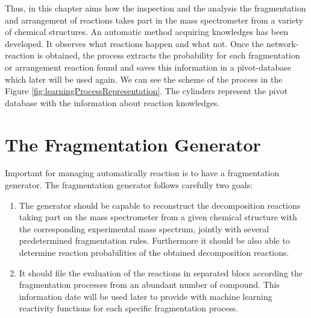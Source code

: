 \documentclass[10pt]{bmc_article}
\newenvironment{bmcformat}{\begin{raggedright}\baselineskip20pt\sloppy\setboolean{publ}{false}}{\end{raggedright}\baselineskip20pt\sloppy}
\begin{document}
\begin{bmcformat}
Thus, in this chapter aims how the inspection and the analysis the 
fragmentation and arrangement of reactions takes part in the mass spectrometer 
from a variety of chemical structures. An automatic method acquiring knowledges 
has been developed. It observes what reactions happen and what not. Once the 
network-reaction is obtained, the process extracts the probability for each 
fragmentation or arrangement reaction found and saves this information in a 
pivot-database which later will be used again. We can see the scheme of the 
process in the Figure \ref{fig:learningProcessRepresentation}. The cylinders 
represent the pivot database with the information about reaction knowledges.

\section{The Fragmentation Generator}

Important for managing automatically reaction is to have a fragmentation 
generator. The fragmentation generator follows carefully two goals:
\begin{enumerate}
\item The generator should be capable to reconstruct the decomposition 
reactions taking part on the mass spectrometer from a given chemical structure 
with the corresponding experimental mass spectrum, jointly with several 
predetermined fragmentation rules. Furthermore it should be also able to 
determine reaction probabilities of the obtained decomposition reactions.
\item It should file the evaluation of the reactions in separated blocs 
according the fragmentation processes from an abundant number of compound. This 
information date will be used later to provide with machine learning reactivity 
functions for each specific fragmentation process.
\end{enumerate}


\end{bmcformat}
\end{document}
